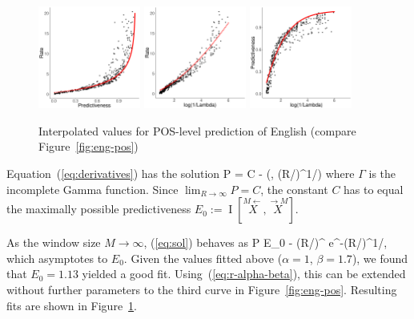 \documentclass[entropy,article,submit,moreauthors,pdftex,10pt,a4paper]{Definitions/mdpi}
\newcommand{\finitefuture}{\stackrel{\rightarrow \scriptscriptstyle{M}}{X}}
\newcommand{\finitepast}{\stackrel{\scriptscriptstyle{M}\leftarrow}{X}}%
\let\oldequation\equation
\let\oldendequation\endequation
\renewenvironment{equation}
  {\linenomathNonumbers\oldequation}
  {\oldendequation\endlinenomath}
\begin{document}
\begin{figure}
\includegraphics[width=0.3\textwidth]{code/figures/english-info-fitted.pdf}
\includegraphics[width=0.3\textwidth]{code/figures/english-logbeta-mem-fitted.pdf}
	\includegraphics[width=0.3\textwidth]{code/figures/english-nlogbeta-ee-fitted.pdf}
	\caption{Interpolated values for POS-level prediction of English (compare Figure~\ref{fig:eng-pos}) }\label{fig:eng-pos-fitted}
\end{figure}


Equation~(\ref{eq:derivatives}) has the solution
\begin{equation}\label{eq:sol}
	P = C - \alpha\beta \cdot \Gamma\left(\beta, (R/\alpha)^{1/\beta}\right)
\end{equation}
where $\Gamma$ is the incomplete Gamma function.
Since $\lim_{R \rightarrow \infty} P = C$, the constant $C$ has to equal the maximally possible predictiveness $E_0 := \operatorname{I}[\finitepast, \finitefuture]$.

As the window size $M \rightarrow \infty$, (\ref{eq:sol}) behaves as
\begin{equation}
	P \approx E_0 - \alpha\beta \cdot (R/\alpha)^{} e^{-(R/\alpha)^{1/\beta}},
\end{equation}
which asymptotes to $E_0$.
Given the values fitted above ($\alpha=1$, $\beta=1.7$), we found that $E_0 = 1.13$ yielded a good fit.
Using~(\ref{eq:r-alpha-beta}), this can be extended without further parameters to the third curve in Figure~\ref{fig:eng-pos}.
Resulting fits are shown in Figure~\ref{fig:eng-pos-fitted}.
\end{document}
